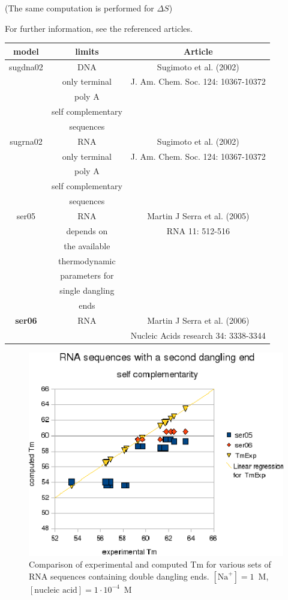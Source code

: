 \documentclass{article}
\begin{document}
       (The same computation is performed for $\Delta S$)

For further information, see the referenced articles.

\begin{table}[h][c]
\begin{tabular}[h]{| c | c | c |}
\textbf{model} & \textbf{limits} & \textbf{Article} \\
\hline
sugdna02 & DNA & Sugimoto et al. (2002)\\
 & only terminal & J. Am. Chem. Soc. 124: 10367-10372 \\
 & poly A & \\
 & self complementary & \\
 & sequences & \\
 \hline
sugrna02 & RNA & Sugimoto et al. (2002)\\
 & only terminal & J. Am. Chem. Soc. 124: 10367-10372 \\
 & poly A & \\
 & self complementary & \\
 & sequences & \\
 \hline
ser05 & RNA & Martin J Serra et al. (2005)\\
 & depends on & RNA 11: 512-516 \\
 & the available & \\
 & thermodynamic & \\
 & parameters for & \\
 & single dangling & \\
 & ends & \\
 \hline
\textbf{ser06} & RNA & Martin J Serra et al. (2006)\\
 & & Nucleic Acids research 34: 3338-3344 \\
\hline
\end{tabular}
\end{table}

\begin{figure}[h]
\includegraphics[width=1\linewidth]{images/RNASecondDanglingEnd}
\caption{Comparison of experimental and computed Tm for various sets of
 RNA sequences containing double dangling ends. $[\mbox{Na}^+] = 1$~M, $[\mbox{nucleic acid}] = 1\cdot{}10^{-4}$~M}
\end{figure}
\end{document}
